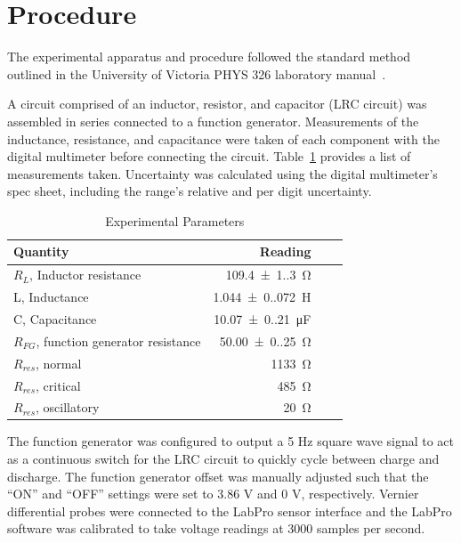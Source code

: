 \section{Procedure}

The experimental apparatus and procedure followed the standard method
    outlined in the University of Victoria PHYS 326 laboratory manual~\cite{phys326}.

A circuit comprised of an inductor, resistor, and capacitor (LRC circuit) was assembled in series connected to a
function generator.
Measurements of the inductance, resistance, and capacitance were taken of each component with the digital multimeter
before connecting the circuit.
Table~\ref{tab:params} provides a list of measurements taken.
Uncertainty was calculated using the digital multimeter's spec sheet, including the range's relative and per digit
uncertainty.

\begin{table}[htbp]
\caption{Experimental Parameters}
\begin{tabular}{lrrr}
\toprule
{Quantity} & {Reading} \\
\midrule
$R_L$, Inductor resistance & \qty{109.4(1.3)}{\ohm} \\
L, Inductance & \qty{1.044(0.072)}{\henry} \\
C, Capacitance & \qty{10.07(0.21)}{\micro\farad}\\
$R_{FG}$, function generator resistance & \qty{50.00(0.25)}{\ohm} \\
$R_{res}$, normal & \qty{1133}{\ohm} \\
$R_{res}$, critical & \qty{485}{\ohm} \\
$R_{res}$, oscillatory & \qty{20}{\ohm} \\
\bottomrule
\end{tabular}\label{tab:params}
\end{table}

The function generator was configured to output a 5 Hz square wave signal to act as a continuous
switch for the LRC circuit to quickly cycle between charge and discharge.
The function generator offset was manually adjusted such that the ``ON'' and ``OFF'' settings were set to 3.86 V and
0 V, respectively.
Vernier differential probes were connected to the LabPro sensor interface and the LabPro software was calibrated to
take voltage readings at 3000 samples per second.

